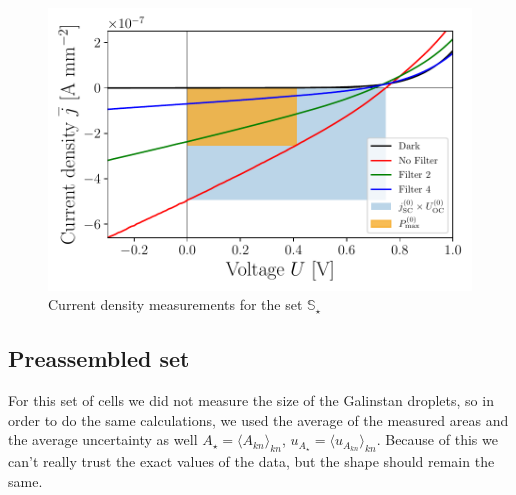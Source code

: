 \begin{figure}[ht]\centering
\includegraphics[width=\columnwidth]{../../../IV-Curve-Analysis/OSCPGraph.pdf}
\caption{Current density measurements for the set $\mathbb{S}_\star$}
\label{fig:OSCstarGraph}
\end{figure}


\subsection{Preassembled set}

For this set of cells we did not measure the size of the Galinstan droplets, so in order to do the same calculations, we used the average of the measured areas and the average uncertainty as well $A_\star = \langle A_{kn} \rangle_{kn}$, $u_{A_\star} = \langle u_{A_{kn}}  \rangle_{kn}$. Because of this we can't really trust the exact values of the data, but the shape should remain the same.

